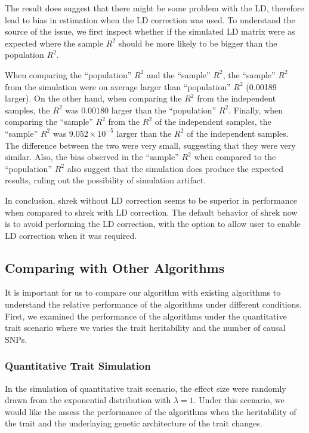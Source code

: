 		The result does suggest that there might be some problem with the \gls{LD}, therefore lead to bias in estimation when the \gls{LD} correction was used. 
		To understand the source of the issue, we first inspect whether if the simulated \gls{LD} matrix were as expected where the sample $R^2$ should be more likely to be bigger than the population $R^2$.
		
		When comparing the ``population'' $R^2$ and the ``sample'' $R^2$, the ``sample'' $R^2$ from the simulation were on average larger than ``population'' $R^2$ (0.00189 larger).
		On the other hand, when comparing the $R^2$ from the independent samples, the $R^2$ was 0.00180 larger than the ``population'' $R^2$. 
		Finally, when comparing the ``sample'' $R^2$ from the $R^2$ of the independent samples, the ``sample'' $R^2$ was $9.052\times10^{-5}$ larger than the $R^2$ of the independent samples.
		The difference between the two were very small, suggesting that they were very similar.
		Also, the bias observed in the ``sample'' $R^2$ when compared to the ``population'' $R^2$ also suggest that the simulation does produce the expected results, ruling out the possibility of simulation artifact.
		
		
		
		In conclusion, \gls{shrek} without \gls{LD} correction seems to be superior in performance when compared to \gls{shrek} with \gls{LD} correction. %
		The default behavior of \gls{shrek} now is to avoid performing the \gls{LD} correction, with the option to allow user to enable \gls{LD} correction when it was required.
		
		\subsection{Comparing with Other Algorithms}
		It is important for us to compare our algorithm with existing algorithms to understand the relative performance of the algorithms under different conditions.
		First, we examined the performance of the algorithms under the quantitative trait scenario where we varies the trait heritability and the number of causal \glspl{SNP}.
		\subsubsection{Quantitative Trait Simulation}
		
		In the simulation of quantitative trait scenario, the effect size were randomly drawn from the exponential distribution with $\lambda=1$. 
		Under this scenario, we would like the assess the performance of the algorithms when the heritability of the trait and the underlaying genetic architecture of the trait changes.
		
